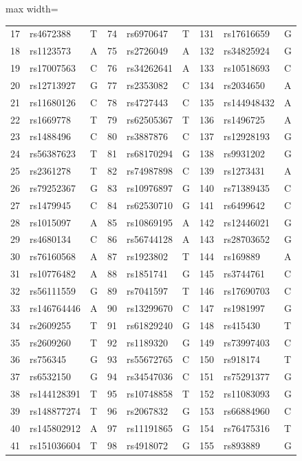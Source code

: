 \begin{table}[!t]
\begin{adjustbox}{max width=\textwidth}
\begin{tabular}{rll@{\hspace{6pt}}rll@{\hspace{6pt}}rll}
17 & rs4672388 & T & 74 & rs6970647 & T & 131 & rs17616659 & G\\
18 & rs1123573 & A & 75 & rs2726049 & A & 132 & rs34825924 & G\\
19 & rs17007563 & C & 76 & rs34262641 & A & 133 & rs10518693 & C\\
20 & rs12713927 & G & 77 & rs2353082 & C & 134 & rs2034650 & A\\
21 & rs11680126 & C & 78 & rs4727443 & C & 135 & rs144948432 & A\\
22 & rs1669778 & T & 79 & rs62505367 & T & 136 & rs1496725 & A\\
23 & rs1488496 & C & 80 & rs3887876 & C & 137 & rs12928193 & G\\
24 & rs56387623 & T & 81 & rs68170294 & G & 138 & rs9931202 & G\\
25 & rs2361278 & T & 82 & rs74987898 & C & 139 & rs1273431 & A\\
26 & rs79252367 & G & 83 & rs10976897 & G & 140 & rs71389435 & C\\
27 & rs1479945 & C & 84 & rs62530710 & G & 141 & rs6499642 & C\\
28 & rs1015097 & A & 85 & rs10869195 & A & 142 & rs12446021 & G\\
29 & rs4680134 & C & 86 & rs56744128 & A & 143 & rs28703652 & G\\
30 & rs76160568 & A & 87 & rs1923802 & T & 144 & rs169889 & A\\
31 & rs10776482 & A & 88 & rs1851741 & G & 145 & rs3744761 & C\\
32 & rs56111559 & G & 89 & rs7041597 & T & 146 & rs17690703 & C\\
33 & rs146764446 & A & 90 & rs13299670 & C & 147 & rs1981997 & G\\
34 & rs2609255 & T & 91 & rs61829240 & G & 148 & rs415430 & T\\
35 & rs2609260 & T & 92 & rs1189320 & G & 149 & rs73997403 & C\\
36 & rs756345 & G & 93 & rs55672765 & C & 150 & rs918174 & T\\
37 & rs6532150 & G & 94 & rs34547036 & C & 151 & rs75291377 & G\\
38 & rs144128391 & T & 95 & rs10748858 & T & 152 & rs11083093 & G\\
39 & rs148877274 & T & 96 & rs2067832 & G & 153 & rs66884960 & C\\
40 & rs145802912 & A & 97 & rs11191865 & G & 154 & rs76475316 & T\\
41 & rs151036604 & T & 98 & rs4918072 & G & 155 & rs893889 & G\\

\end{tabular}
\end{adjustbox}
\end{table}
